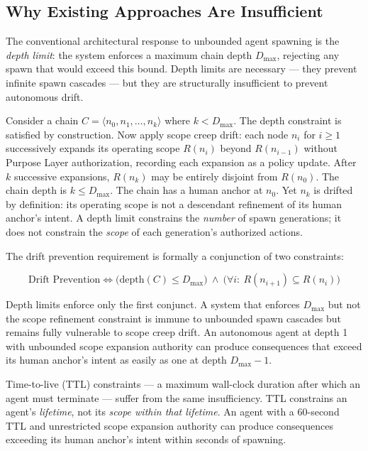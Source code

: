 \subsection{Why Existing Approaches Are Insufficient}

The conventional architectural response to unbounded agent spawning is the \emph{depth limit}: the system enforces a maximum chain depth $D_{\max}$, rejecting any spawn that would exceed this bound. Depth limits are necessary — they prevent infinite spawn cascades — but they are structurally insufficient to prevent autonomous drift.

Consider a chain $C = \langle n_0, n_1, \ldots, n_k \rangle$ where $k < D_{\max}$. The depth constraint is satisfied by construction. Now apply scope creep drift: each node $n_i$ for $i \geq 1$ successively expands its operating scope $R(n_i)$ beyond $R(n_{i-1})$ without Purpose Layer authorization, recording each expansion as a policy update. After $k$ successive expansions, $R(n_k)$ may be entirely disjoint from $R(n_0)$. The chain depth is $k \leq D_{\max}$. The chain has a human anchor at $n_0$. Yet $n_k$ is drifted by definition: its operating scope is not a descendant refinement of its human anchor's intent. A depth limit constrains the \emph{number} of spawn generations; it does not constrain the \emph{scope} of each generation's authorized actions.

The drift prevention requirement is formally a conjunction of two constraints:

\begin{equation}
\text{Drift Prevention} \iff \bigl(\text{depth}(C) \leq D_{\max}\bigr) \ \land \ \bigl(\forall i:\ R(n_{i+1}) \subseteq R(n_i)\bigr)
\label{eq:intro-drift-prevention}
\end{equation}

Depth limits enforce only the first conjunct. A system that enforces $D_{\max}$ but not the scope refinement constraint is immune to unbounded spawn cascades but remains fully vulnerable to scope creep drift. An autonomous agent at depth 1 with unbounded scope expansion authority can produce consequences that exceed its human anchor's intent as easily as one at depth $D_{\max} - 1$.

Time-to-live (TTL) constraints — a maximum wall-clock duration after which an agent must terminate — suffer from the same insufficiency. TTL constrains an agent's \emph{lifetime}, not its \emph{scope within that lifetime}. An agent with a 60-second TTL and unrestricted scope expansion authority can produce consequences exceeding its human anchor's intent within seconds of spawning.

